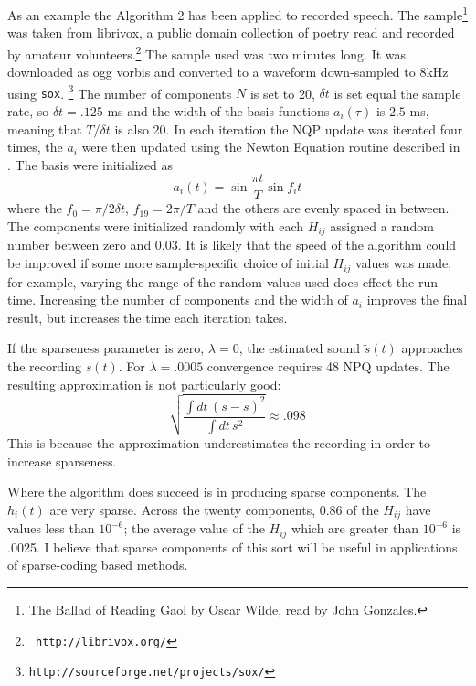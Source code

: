 \documentclass[11pt,twocolumn]{IEEEtran}
\begin{document}
As an example the Algorithm 2 has been applied to recorded speech. The
sample\footnote{The Ballad of Reading Gaol by Oscar Wilde, read by
  John Gonzales.} was taken from librivox, a public domain collection
of poetry read and recorded by amateur volunteers.\footnote{{\tt
    http://librivox.org/}} The sample used was two minutes long. It
was downloaded as ogg vorbis and converted to a waveform down-sampled
to 8kHz using {\tt sox}.
\footnote{{\tt http://sourceforge.net/projects/sox/}} The number of components $N$ is set to 20, $\delta t$ is
set equal the sample rate, so $\delta t=.125$ ms and the width of the
basis functions $a_i(\tau)$ is $2.5$ ms, meaning that $T/\delta t$ is
also 20. In each iteration the NQP update was iterated four times, the $a_i$
were then updated using the Newton Equation routine described in \cite{PressEtAl2007a}. The basis were initialized as
\begin{equation}
a_i(t)=\sin{\frac{\pi t}{T}}\sin{f_i t}
\end{equation}
where the $f_0=\pi/2\delta t$, $f_{19}=2\pi/T$ and the others are evenly
spaced in between. The components were initialized randomly with each
$H_{ij}$ assigned a random number between zero and $0.03$. It is
likely that the speed of the algorithm could be improved if some more
sample-specific choice of initial $H_{ij}$ values was made, for
example, varying the range of the random values used does effect the
run time. Increasing the number of components and the width of $a_i$
improves the final result, but increases the time each iteration
takes.

If the sparseness parameter is zero, $\lambda=0$, the estimated sound
$\tilde{s}(t)$ approaches the recording $s(t)$. For $\lambda=.0005$
convergence requires 48 NPQ updates. The resulting approximation is not
particularly good:
\begin{equation}
\sqrt{\frac{\int{dt\,(s-\tilde{s})^2}}{\int{dt\,s^2}}}\approx .098
\end{equation}
This is because the approximation underestimates the recording in
order to increase sparseness. 

Where the algorithm does succeed is in producing sparse
components. The $h_i(t)$ are very sparse. Across the twenty
components, 0.86 of the $H_{ij}$ have values less than $10^{-6}$; the
average value of the $H_{ij}$ which are greater than $10^{-6}$ is
.0025. I believe that sparse components of this sort will be useful in
applications of sparse-coding based methods.

\end{document}
